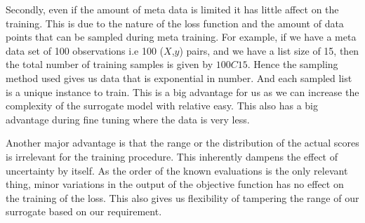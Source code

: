 \documentclass[12pt, twoside, ngerman]{report}
\begin{document}
Secondly,  even if the amount of meta data is limited it has little affect on the training.
This is due to the nature of the loss function and the amount of data points that can be sampled during meta training.
For example,  if we have a meta data set of 100 observations i.e 100 ($X$,$y$) pairs,  and we have a list size of 15,  then the total number of training samples is given by $100C15$.
Hence the sampling method used gives us data that is exponential in number.
And each sampled list is a unique instance to train.
This is a big advantage for us as we can increase the complexity of the surrogate model with relative easy.
This also has a big advantage during fine tuning where the data is very less.

Another major advantage is that the range or the distribution of the actual scores is irrelevant for the training procedure.
This inherently dampens the effect of uncertainty by itself.
As the order of the known evaluations is the  only relevant thing,  minor variations in the output of the objective function has no effect on the training of the loss.
This also gives us flexibility of tampering the range of our surrogate based on our requirement.
\end{document}

